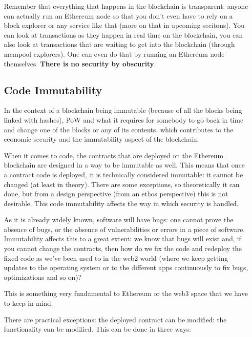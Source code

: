 Remember that everything that happens in the blockchain is transparent;
anyone can actually run an Ethereum node so that you don't even have to
rely on a block explorer or any service like that (more on that in
upcoming secitons). You can look at transactions as they happen in real
time on the blockchain, you can also look at transactions that are
waiting to get into the blockchain (through mempool explorers). One can
even do that by running an Ethereum node themselves. \textbf{There is no
security by obscurity}.

\subsection{Code Immutability}\label{code-immutability}

In the context of a blockchain being immutable (because of all the
blocks being linked with hashes), PoW and what it requires for somebody
to go back in time and change one of the blocks or any of its contents,
which contributes to the economic security and the immutability aspect
of the blockchain.

When it comes to code, the contracts that are deployed on the Ethereum
blockchain are designed in a way to be immutable as well. This means
that once a contract code is deployed, it is technically considered
immutable: it cannot be changed (at least in theory). There are some
exceptions, so theoretically it can done, but from a design perspective
(from an ethos perspective) this is not desirable. This code
immutability affects the way in which security is handled.

As it is already widely known, software will have bugs: one cannot prove
the absence of bugs, or the absence of vulnerabilities or errors in a
piece of software. Immutability affects this to a great extent: we know
that bugs will exist and, if you cannot change the contracts, then how
do we fix the code and redeploy the fixed code as we've been used to in
the web2 world (where we keep getting updates to the operating system or
to the different apps continuously to fix bugs, optimizations and so
on)?

This is something very fundamental to Ethereum or the web3 space that we
have to keep in mind.

There are practical exceptions: the deployed contract can be modified:
the functionality can be modified. This can be done in three ways:

